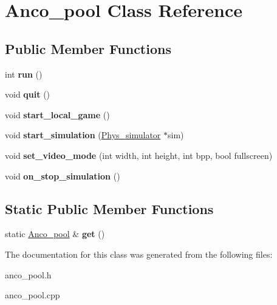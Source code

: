 \hypertarget{class_anco__pool}{
\section{Anco\_\-pool Class Reference}
\label{class_anco__pool}
}
\subsection*{Public Member Functions}
\begin{DoxyCompactItemize}
\item 
\hypertarget{class_anco__pool_a0125ea69a61023f45e0125170f03199f}{
int {\bfseries run} ()}
\label{class_anco__pool_a0125ea69a61023f45e0125170f03199f}

\item 
\hypertarget{class_anco__pool_a8d0486618ba44af1f9672fa8231d4a8c}{
void {\bfseries quit} ()}
\label{class_anco__pool_a8d0486618ba44af1f9672fa8231d4a8c}

\item 
\hypertarget{class_anco__pool_a7d7c939aeb232f85c7eeda6be5fea3a2}{
void {\bfseries start\_\-local\_\-game} ()}
\label{class_anco__pool_a7d7c939aeb232f85c7eeda6be5fea3a2}

\item 
\hypertarget{class_anco__pool_a14733806872bdc573d60ab14171bf81f}{
void {\bfseries start\_\-simulation} (\hyperlink{class_phys__simulator}{Phys\_\-simulator} $\ast$sim)}
\label{class_anco__pool_a14733806872bdc573d60ab14171bf81f}

\item 
\hypertarget{class_anco__pool_a2738abea67c3074ea502c650a779ca95}{
void {\bfseries set\_\-video\_\-mode} (int width, int height, int bpp, bool fullscreen)}
\label{class_anco__pool_a2738abea67c3074ea502c650a779ca95}

\item 
\hypertarget{class_anco__pool_afc85dfe2504c9af787aeda1ecccced23}{
void {\bfseries on\_\-stop\_\-simulation} ()}
\label{class_anco__pool_afc85dfe2504c9af787aeda1ecccced23}

\end{DoxyCompactItemize}
\subsection*{Static Public Member Functions}
\begin{DoxyCompactItemize}
\item 
\hypertarget{class_anco__pool_a2d4c12e72a59912ad90898460a576e68}{
static \hyperlink{class_anco__pool}{Anco\_\-pool} \& {\bfseries get} ()}
\label{class_anco__pool_a2d4c12e72a59912ad90898460a576e68}

\end{DoxyCompactItemize}


The documentation for this class was generated from the following files:\begin{DoxyCompactItemize}
\item 
anco\_\-pool.h\item 
anco\_\-pool.cpp\end{DoxyCompactItemize}
